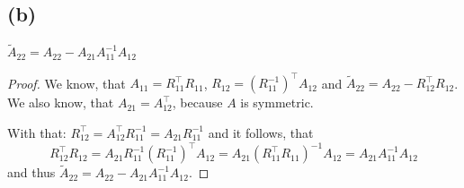 \documentclass[a4paper, 11pt]{article}
\begin{document}
\subsection*{(b)}
$\tilde{A}_{22} = A_{22} - A_{21}A_{11}^{-1}A_{12}$
\begin{proof}
  We know, that $A_{11} =  R_{11}^\top R_{11}$, $R_{12} = (R_{11}^{-1})^\top
  A_{12}$ and $\tilde{A}_{22} = A_{22} - R_{12}^\top R_{12}$.  We also know,
  that $A_{21} = A_{12}^\top$, because $A$ is symmetric.

  With that: $R_{12}^\top = A_{12}^\top R_{11}^{-1} = A_{21}R_{11}^{-1}$
  and it follows, that
  \begin{equation*}
    R_{12}^\top R_{12} = A_{21}R_{11}^{-1}(R_{11}^{-1})^\top A_{12} =
    A_{21}(R_{11}^\top R_{11})^{-1} A_{12} = A_{21}A_{11}^{-1} A_{12}
  \end{equation*}
  and thus $\tilde{A}_{22} = A_{22} - A_{21}A_{11}^{-1}A_{12}$.
\end{proof}
\end{document}
